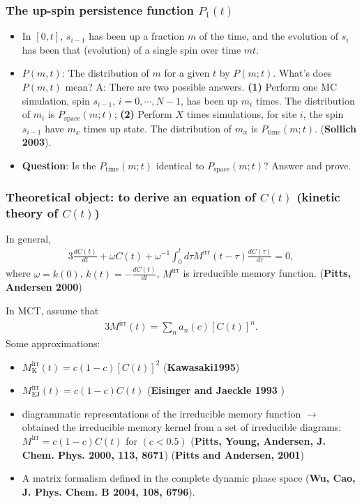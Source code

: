 \documentclass[8pt]{beamer}
\begin{document}
\begin{frame}
	\frametitle{The up-spin persistence function $P_1(t)$}
	\begin{itemize}
		\item In $[0,t]$, $s_{i-1}$ has been up a fraction $m$ of the time, and the evolution of $s_i$ has been that (evolution) of a single spin over time $mt$.
		\item $P(m,t)$: The distribution of $m$ for a given $t$ by $P(m;t)$. What's does $P(m,t)$ mean? A: There are two possible answers. \textbf{(1)} Perform one MC simulation, spin $s_{i-1}$, $i =0,\cdots, N-1$,  has been up $m_i$ times. The distribution of $m_i$ is $P_\text{space}(m; t)$; \textbf{(2)} Perform $X$ times simulations, for site $i$, the spin $s_{i-1}$ have $m_x$ times up state. The distribution of $m_x$ is $P_\text{time}(m;t)$.     
         (\textbf{Sollich 2003}).
         \item \textbf{Question}: Is the $P_\text{time}(m;t)$ identical to $P_\text{space}(m;t)$?  Answer and prove. 
	\end{itemize}	
\end{frame}

\begin{frame}
	\frametitle{Theoretical object: to derive an equation of $C(t)$ (kinetic theory of $C(t)$)}
	In general,
	\begin{alignat}{3}
		\frac{dC(t)}{dt} + \omega C(t) + \omega^{-1} \int_0^t d\tau M^\text{irr}(t-\tau) \frac{dC(\tau)}{d\tau} = 0,
	\end{alignat}
where $\omega = k(0)$, $k(t) = -\frac{dC(t)}{dt}$, $M^\text{irr}$ is irreducible memory function.  (\textbf{Pitts, Andersen 2000})

In MCT, assume that
\begin{alignat}{3}
M^\text{irr}(t)=\sum_n a_n(c) [C(t)]^n. 
\end{alignat}
Some approximations:
\begin{itemize}
	\item  $M^\text{irr}_\text{K}(t) = c(1-c) [C(t)]^2$ (\textbf{Kawasaki1995})
	\item  $M^\text{irr}_\text{EJ}(t) = c(1-c) C(t) $ (\textbf{Eisinger and Jaeckle 1993} )
	\item diagrammatic representations of the irreducible memory function $\to$ obtained the irreducible memory kernel from a set of irreducible diagrams: $M^\text{irr} = c(1-c) C(t)$ for $(c< 0.5)$ (\textbf{Pitts, Young, Andersen, J. Chem. Phys. 2000, 113, 8671})
	 (\textbf{Pitts and Andersen, 2001})
	 \item A matrix formalism defined in the complete dynamic phase space (\textbf{Wu, Cao, J. Phys. Chem. B 2004, 108, 6796}).%
\end{itemize}	
\end{frame}
\end{document}
